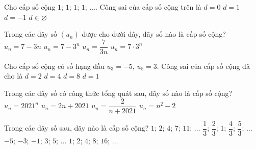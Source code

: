 

\begin{ex}%
	Cho cấp số  cộng $1$; $1$; $1$; $1$; $\ldots$. Công sai của cấp số cộng trên là
	 \choice
		 {\True $d=0$}
		 {$d=1$}
		{$d=-1$} 
		 {$d\in\varnothing $}
\end{ex}

\begin{ex}%
	Trong các dãy số $(u_n)$ được cho dưới đây, dãy số  nào là cấp số cộng?
	 \choice
		{\True $u_n=7-3n$} 
		{$u_n=7-{3^n}$} 
		{$u_n=\dfrac{7}{3n}$} 
		{$u_n={7\cdot{3}^n}$} 
\end{ex}

\begin{ex}%
	 Cho cấp số cộng có số hạng đầu $u_3=-5$, $u_5=3$. Công sai của cấp số cộng đã cho là
	\choice 
		{$d=2$} 
		 {\True $d=4$}
		{$d=8$} 
		{$d=1$} 
\end{ex}

\begin{ex}%
	 Trong các dãy số có công thức tổng quát sau, dãy số nào là cấp số cộng?
	 \choice
		 {$u_n=2021^n$}
		 {\True $u_n=2n+2021$}
		{$u_n=\dfrac{2}{n+2021}$} 
		 {$u_n=n^2-2$}
\end{ex}

\begin{ex}%
	Trong các dãy  số sau, dãy nào là cấp số cộng?
	\choice 
		{$1$; $2$; $4$; $7$; $11$;  $\ldots$}
		{\True  $\dfrac{1}{3}$; $\dfrac{2}{3}$; $1$; $\dfrac{4}{3}$; $\dfrac{5}{3}$; $\ldots$}
		{$-5$; $-3$; $-1$;  $3$; $5$; $\ldots$}
		{$1$; $2$; $4$; $8$;  $16$; $\ldots$}
\end{ex}


